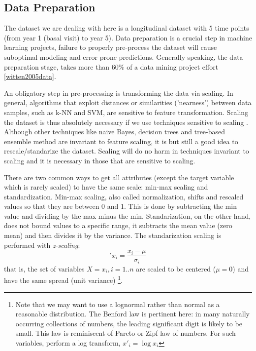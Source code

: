 \documentclass[11pt]{article}
\begin{document}
\subsection{Data Preparation} 
\label{sse:dp}
  
The dataset we are dealing with here is a longitudinal dataset with 5 time points (from year 1 (basal visit) to year 5).
Data preparation is a crucial step in machine learning projects, failure to properly pre-process the dataset will cause suboptimal modeling and error-prone predictions.
Generally speaking, the data preparation stage, takes more than $60\%$ of a data mining project effort \ref{witten2005data}.

An obligatory step in pre-processing is transforming the data via scaling. 
In general, algorithms that exploit distances or similarities ('nearness') between data samples, such as k-NN and SVM, are sensitive to feature transformation. 
Scaling the dataset is thus absolutely necessary if we use techniques sensitive to scaling \cite{wu2012foundations}. Although other techniques like naive Bayes, decision trees and tree-based ensemble method are invariant to feature scaling, it is but still a good idea to rescale/standarize the dataset. Scaling will do no harm in techniques invariant to scaling and it is necessary in those that are sensitive to scaling. 

There are two common ways to get all attributes (except the target variable which is rarely scaled) to have the same scale: min-max scaling and standardization.
Min-max scaling, also called normalization, shifts and rescaled values so that they are between 0 and 1. This is done by subtracting the min value and dividing by the max minus the min. 
Standarization, on the other hand, does not bound values to a specific range, it subtracts the mean value (zero mean) and then divides it by the variance. 
The standarization scaling is performed with \emph{z-scaling}:
\begin{equation} \label{eq:scaling}
\prime{x}_i=\frac{x_i -\mu}{\sigma_i}
\end{equation}
that is, the set of variables $X = x_i, i=1..n$ are scaled to be centered ($\mu=0$) and have the same spread (unit variance) \footnote{Note that we may want to use a lognormal rather than normal as a reasonable distribution. The Benford law is pertinent here: in many naturally occurring collections of numbers, the leading significant digit is likely to be small. This law is reminiscent of Pareto or Zipf law of numbers. For such variables, perform a log transform, $x'_i = \log x_i$}. 
\end{document}
